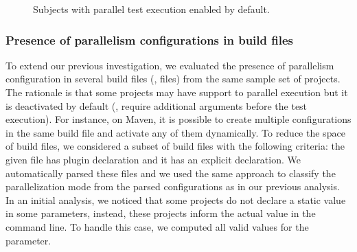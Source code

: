 \begin{figure}[ht!]
    \centering
    \caption{Subjects with parallel test execution enabled by
    default.}
    \label{tab:freqmodes-dynamic}
\end{figure}

\subsubsection{Presence of parallelism configurations in build files}
\label{sec:rqC-2}

To extend our previous investigation, we evaluated the presence of
parallelism configuration in several build files (\ie, \pomf{} files)
from the same sample set of \numMedLong{} projects. The rationale is
that some projects may have support to parallel execution but it is
deactivated by default (\ie, require additional arguments before the
test execution). For instance, on Maven, it is possible to create
multiple configurations in the same build file and activate any of
them dynamically.  To reduce the space of  build files, we
considered a subset of  build files with the following
criteria: the given \pomf{} file has 
plugin declaration and it has an explicit 
declaration. We automatically parsed these  files and we used
the same approach to classify the parallelization mode from the parsed
configurations as in our previous analysis. In an initial analysis, we
noticed that some projects do not declare a static value in some
parameters, instead, these projects inform the actual value in the
command line. To handle this case, we computed all valid values for
the parameter.

